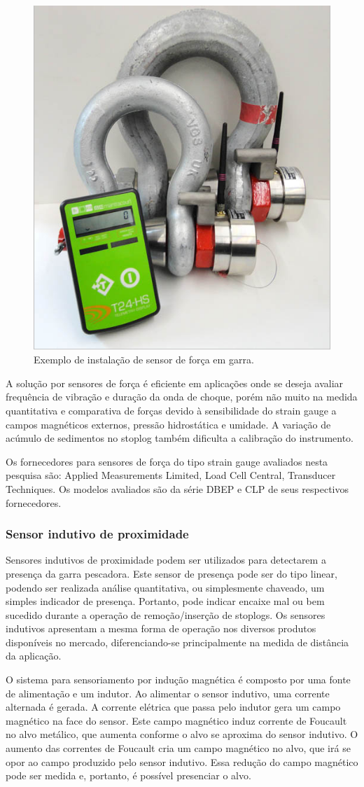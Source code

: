   \begin{figure}[H]
    \centering
    \includegraphics[width=0.4\columnwidth]{figs/forca/2.png}
    \caption{Exemplo de instalação de sensor de força em garra.}
    \label{forca_2}
\end{figure}

A solução por sensores de força é eficiente em aplicações onde se deseja avaliar frequência de vibração e duração da onda de choque, porém não muito na medida quantitativa e comparativa de forças devido à sensibilidade do strain gauge a campos magnéticos externos, pressão hidrostática e umidade. A variação de acúmulo de sedimentos no stoplog também dificulta a calibração do instrumento.

Os fornecedores para sensores de força do tipo strain gauge avaliados nesta pesquisa são: Applied Measurements Limited, Load Cell Central, Transducer Techniques. Os modelos avaliados são da série DBEP e CLP de seus respectivos fornecedores.



\subsubsection{Sensor indutivo de proximidade}

Sensores indutivos de proximidade podem ser utilizados para detectarem a presença da garra pescadora. Este sensor de presença pode ser do tipo linear, podendo ser realizada análise quantitativa, ou simplesmente chaveado, um simples indicador de presença. Portanto, pode indicar encaixe mal ou bem sucedido durante a operação de remoção/inserção de stoplogs. Os sensores indutivos apresentam a mesma forma de operação nos diversos produtos disponíveis no mercado, diferenciando-se principalmente na medida de distância da aplicação.

 O sistema para sensoriamento por indução magnética é composto por uma fonte de alimentação e um indutor. Ao alimentar o sensor indutivo, uma corrente alternada é gerada. A corrente elétrica que passa pelo indutor gera um campo magnético na face do sensor. Este campo magnético induz corrente de Foucault no alvo metálico, que aumenta conforme o alvo se aproxima do sensor indutivo. O aumento das correntes de Foucault cria um campo magnético no alvo, que irá se opor ao campo produzido pelo sensor indutivo. Essa redução do campo magnético pode ser medida e, portanto, é possível presenciar o alvo.

